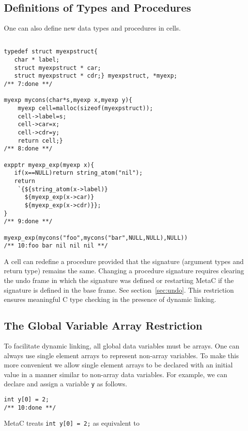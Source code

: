 \documentclass{article}
\begin{document}
\subsection{Definitions of Types and Procedures}

One can also define new data types and procedures in cells.

\begin{verbatim}

typedef struct myexpstruct{
   char * label;
   struct myexpstruct * car;
   struct myexpstruct * cdr;} myexpstruct, *myexp;
/** 7:done **/

myexp mycons(char*s,myexp x,myexp y){
    myexp cell=malloc(sizeof(myexpstruct));
    cell->label=s;
    cell->car=x;
    cell->cdr=y;
    return cell;}
/** 8:done **/

expptr myexp_exp(myexp x){
   if(x==NULL)return string_atom("nil");
   return
    `{${string_atom(x->label)}
      ${myexp_exp(x->car)}
      ${myexp_exp(x->cdr)}};
}
/** 9:done **/

myexp_exp(mycons("foo",mycons("bar",NULL,NULL),NULL))
/** 10:foo bar nil nil nil **/
\end{verbatim}

A cell can redefine a procedure provided that the
signature (argument types and return type) remains the same. Changing a procedure signature
requires clearing the undo frame in which the signature was defined or restarting MetaC if the signature is defined in the base frame.  See section~\ref{sec:undo}.
This restriction ensures
meaningful C type checking in the presence of dynamic linking.

\subsection{The Global Variable Array Restriction}

To facilitate dynamic linking, all global data
variables must be arrays. One can always use single element
arrays to represent non-array variables.  To make this more convenient
we allow single element arrays to be declared with an initial value in a
manner similar to non-array data variables.  For example, we can declare and assign a variable {\tt y}
as follows.

\begin{verbatim}
int y[0] = 2;
/** 10:done **/
\end{verbatim}

MetaC treats {\tt int y[0] = 2;} as equivalent to
\end{document}
